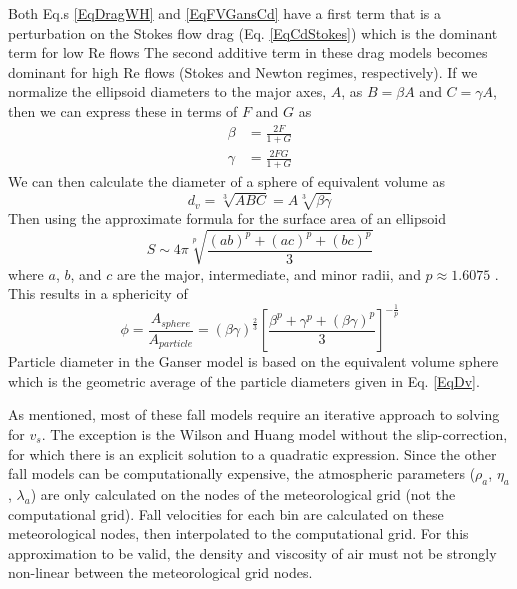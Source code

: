 Both Eq.s \ref{EqDragWH} and \ref{EqFVGansCd} have a first term that is a
perturbation on the Stokes flow drag (Eq. \ref{EqCdStokes}) which is the
dominant term for low $\mathrm{Re}$ flows 
The second additive term in these drag models becomes
dominant for high $\mathrm{Re}$ flows (Stokes and Newton regimes,
respectively).  If we normalize the ellipsoid diameters to the major axes,
$A$, as $B=\beta A$ and $C=\gamma A$, then we can
express these in terms of $F$ and $G$ as
\begin{eqnarray}\label{EqShapeBetaGamma}
\beta &= \frac{2F}{1+G} \\
\gamma&= \frac{2FG}{1+G}
\end{eqnarray}
We can then calculate the diameter of
a sphere of equivalent volume as
\begin{equation}\label{EqDv}
d_v = \sqrt[3]{ABC} = A \sqrt[3]{\beta \gamma}
\end{equation}
Then using the approximate formula for the surface area of an ellipsoid
\begin{equation}\label{EqAreaEllipsoid}
S \sim 4 \pi \sqrt[p]{\frac{(ab)^p + (ac)^p + (bc)^p}{3}}
\end{equation}
where $a$, $b$, and $c$ are the major, intermediate, and minor radii, and 
$p \approx 1.6075$ \cite{WikiEllipse}.  This results in a sphericity of
\begin{equation}\label{EqSpericity}
\phi = \frac{A_{sphere}}{A_{particle}} =\left( \beta \gamma \right)^{\frac{2}{3}}
\left[ \frac{\beta^p + \gamma^p + \left( \beta \gamma \right)^p}{3} \right]^{-\frac{1}{p}}
\end{equation}
Particle diameter in the Ganser model is based on the equivalent volume sphere which
is the geometric average of the particle diameters given in Eq. \ref{EqDv}.

As mentioned, most of these fall models require an iterative approach to solving
for $v_s$.  The exception is the Wilson and Huang model without the slip-correction,
for which there is an explicit solution to a quadratic expression.  Since the
other fall models can be computationally expensive, the atmospheric parameters
($\rho_a$, $\eta_a$, $\lambda_a$) are only calculated on the nodes of the
meteorological grid (not the computational grid).  Fall velocities for each
bin are calculated on these meteorological nodes,
then interpolated to the computational grid.
For this approximation to be valid, the density and viscosity of air must not
be strongly non-linear between the meteorological grid nodes.

